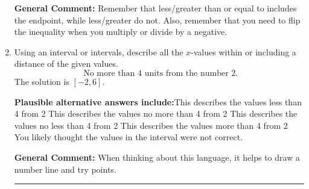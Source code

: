 \documentclass{extbook}[14pt]
\newcommand{\litem}[1]{\item #1

\rule{\textwidth}{0.4pt}}
\begin{document}
\begin{enumerate}
{\textbf{General Comment:} Remember that less/greater than or equal to includes the endpoint, while less/greater do not. Also, remember that you need to flip the inequality when you multiply or divide by a negative.
}
\litem{
Using an interval or intervals, describe all the $x$-values within or including a distance of the given values.
\[ \text{ No more than } 4 \text{ units from the number } 2. \]The solution is \( [-2, 6] \).\begin{enumerate}[label=\Alph*.]
\textbf{Plausible alternative answers include:}This describes the values less than 4 from 2
This describes the values no more than 4 from 2
This describes the values no less than 4 from 2
This describes the values more than 4 from 2
You likely thought the values in the interval were not correct.
\end{enumerate}

\textbf{General Comment:} When thinking about this language, it helps to draw a number line and try points.
}
\end{enumerate}
\end{document}
